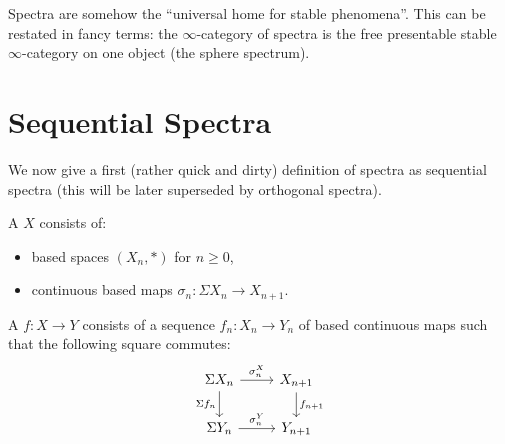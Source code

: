 Spectra are somehow the \enquote{universal home for stable phenomena}. This can be restated in fancy terms: the $\infty$-category of spectra is the free presentable stable $\infty$-category on one object (the sphere spectrum).

\section{Sequential Spectra}

We now give a first (rather quick and dirty) definition of spectra as sequential spectra (this will be later superseded by orthogonal spectra).

\begin{definition!}\label{definition:sequential-spectra}
A  $X$ consists of:
\begin{itemize}
    \item based spaces $(X_n,*)$ for $n\geq0$,
    \item continuous based maps $\sigma_n:\Sigma X_n\to X_{n+1}$.
\end{itemize}
A  $f:X\to Y$ consists of a sequence $f_n:X_n\to Y_n$ of based continuous maps such that the following square commutes:
\[
\begin{tikzcd}
\Sigma X_n \ar[r,"\sigma^X_n"] \ar[d,"\Sigma f_n"'] & X_{n+1} \ar[d,"f_{n+1}"]\\
\Sigma Y_n \ar[r,"\sigma^Y_n"] & Y_{n+1}
\end{tikzcd}
\]
\end{definition!}

